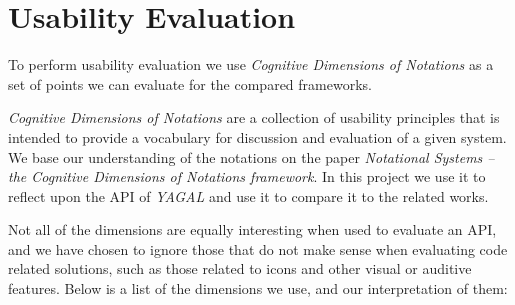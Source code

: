 \section{Usability Evaluation}\label{sec:vocab}
To perform usability evaluation we use \textit{Cognitive Dimensions of Notations} as a set of points we can evaluate for the compared frameworks.

\textit{Cognitive Dimensions of Notations} are a collection of usability principles that is intended to provide a vocabulary for discussion and evaluation of a given system. We base our understanding of the notations on the paper \textit{Notational Systems – the Cognitive Dimensions of Notations framework}\cite{cogDimUsage}. In this project we use it to reflect upon the API of \textit{YAGAL} and use it to compare it to the related works.

Not all of the dimensions are equally interesting when used to evaluate an API, and we have chosen to ignore those that do not make sense when evaluating code related solutions, such as those related to icons and other visual or auditive features. Below is a list of the dimensions we use, and our interpretation of them:

